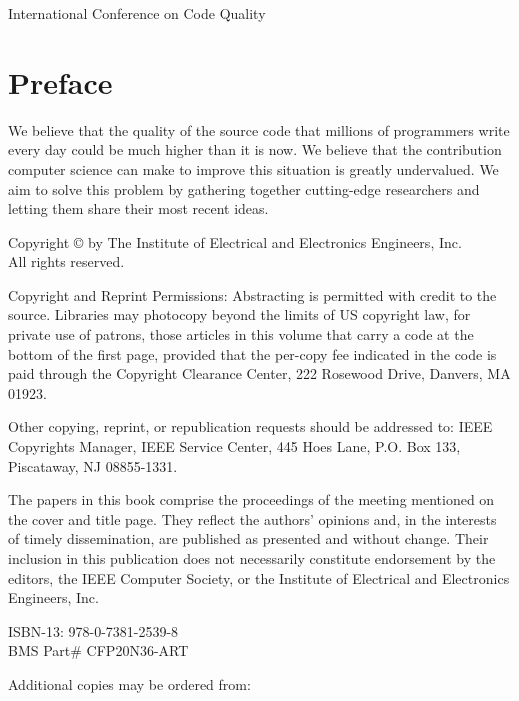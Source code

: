 \documentclass[12pt,twosides]{book}
\begin{document}
International Conference on Code Quality

\newpage
\tableofcontents

\newpage

\section*{Preface}

We believe that the quality of the source code that millions of programmers
write every day could be much higher than it is now. We believe that the
contribution computer science can make to improve this situation is greatly
undervalued. We aim to solve this problem by gathering
together cutting-edge researchers and letting them share their most recent ideas.

\newpage

\begin{center}
Copyright \copyright{} \the\year{}
by The Institute of Electrical and Electronics Engineers, Inc.\\
All rights reserved.
\end{center}

Copyright and Reprint Permissions: Abstracting is permitted with credit to the source. Libraries may photocopy beyond the limits of US copyright law, for private use of patrons, those articles in this volume that carry a code at the bottom of the first page, provided that the per-copy fee indicated in the code is paid through the Copyright Clearance Center, 222 Rosewood Drive, Danvers, MA 01923.

Other copying, reprint, or republication requests should be addressed to: IEEE Copyrights Manager, IEEE Service Center, 445 Hoes Lane, P.O. Box 133, Piscataway, NJ 08855-1331.

The papers in this book comprise the proceedings of the meeting mentioned on the cover and title page. They reflect the authors’ opinions and, in the interests of timely dissemination, are published as presented and without change. Their inclusion in this publication does not necessarily constitute endorsement by the editors, the IEEE Computer Society, or the Institute of Electrical and Electronics Engineers, Inc.

\begin{center}
ISBN-13: 978-0-7381-2539-8\\
BMS Part\# CFP20N36-ART
\end{center}

\begin{center}
Additional copies may be ordered from:
\end{center}
\end{document}
